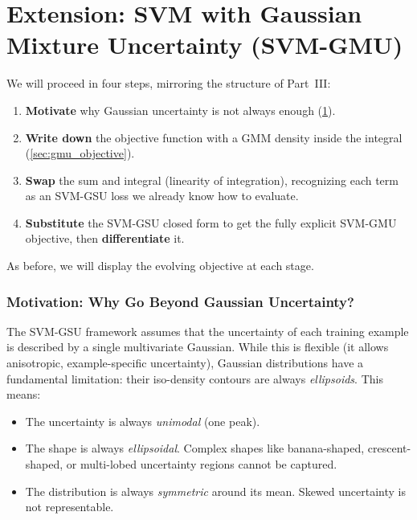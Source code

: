 \documentclass[11pt, letterpaper]{article}
\begin{document}
\part{Extension: SVM with Gaussian Mixture Uncertainty (SVM-GMU)}

\begin{statusbox}
We will proceed in four steps, mirroring the structure of Part~III:
\begin{enumerate}[leftmargin=1.5em, topsep=2pt, itemsep=1pt]
    \item \textbf{Motivate} why Gaussian uncertainty is not always enough (\cref{sec:gmu_motivation}).
    \item \textbf{Write down} the objective function with a GMM density inside the integral (\cref{sec:gmu_objective}).
    \item \textbf{Swap} the sum and integral (linearity of integration), recognizing each term as an SVM-GSU loss we already know how to evaluate.
    \item \textbf{Substitute} the SVM-GSU closed form to get the fully explicit SVM-GMU objective, then \textbf{differentiate} it.
\end{enumerate}
As before, we will display the evolving objective at each stage.
\end{statusbox}

\section{Motivation: Why Go Beyond Gaussian Uncertainty?}\label{sec:gmu_motivation}

The SVM-GSU framework assumes that the uncertainty of each training example is described by a single multivariate Gaussian. While this is flexible (it allows anisotropic, example-specific uncertainty), Gaussian distributions have a fundamental limitation: their iso-density contours are always \emph{ellipsoids}. This means:
\begin{itemize}[leftmargin=2em]
    \item The uncertainty is always \emph{unimodal} (one peak).
    \item The shape is always \emph{ellipsoidal}. Complex shapes like banana-shaped, crescent-shaped, or multi-lobed uncertainty regions cannot be captured.
    \item The distribution is always \emph{symmetric} around its mean. Skewed uncertainty is not representable.
\end{itemize}
\end{document}
